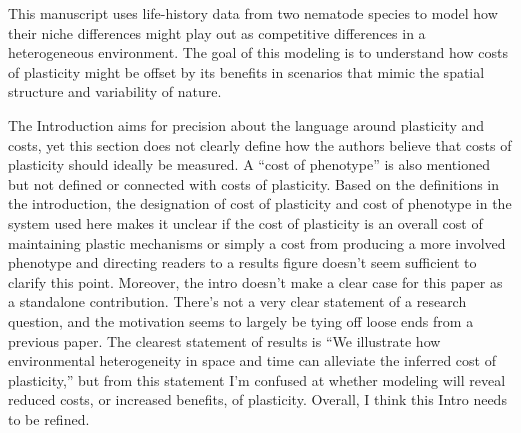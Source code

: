 \documentclass[letterpaper,11pt]{article}
\begin{document}
This manuscript uses life-history data from two nematode species to model how their niche differences might play out as competitive differences in a heterogeneous environment. The goal of this modeling is to understand how costs of plasticity might be offset by its benefits in scenarios that mimic the spatial structure and variability of nature.

The Introduction aims for precision about the language around plasticity and costs, yet this section does not clearly define how the authors believe that costs of plasticity should ideally be measured. A “cost of phenotype” is also mentioned but not defined or connected with costs of plasticity. Based on the definitions in the introduction, the designation of cost of plasticity and cost of phenotype in the system used here makes it unclear if the cost of plasticity is an overall cost of maintaining plastic mechanisms or simply a cost from producing a more involved phenotype and directing readers to a results figure doesn’t seem sufficient to clarify this point. Moreover, the intro doesn’t make a clear case for this paper as a standalone contribution. There’s not a very clear statement of a research question, and the motivation seems to largely be tying off loose ends from a previous paper. The clearest statement of results is “We illustrate how environmental heterogeneity in space and time can alleviate the inferred cost of plasticity,” but from this statement I’m confused at whether modeling will reveal reduced costs, or increased benefits, of plasticity. Overall, I think this Intro needs to be refined.
\end{document}
